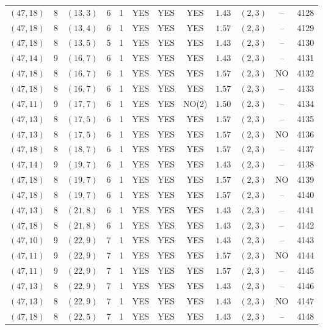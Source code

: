 \begin{longtable}{|c|c|c|c|c|c|c|c|c|c|c|c|}
$(47,18)$ & 8 & $(13,3)$ & 6 & 1 & YES & YES & YES & $1.43$ & $(2,3)$ & -- & 4128\\
$(47,18)$ & 8 & $(13,4)$ & 6 & 1 & YES & YES & YES & $1.57$ & $(2,3)$ & -- & 4129\\
$(47,18)$ & 8 & $(13,5)$ & 5 & 1 & YES & YES & YES & $1.43$ & $(2,3)$ & -- & 4130\\
$(47,14)$ & 9 & $(16,7)$ & 6 & 1 & YES & YES & YES & $1.43$ & $(2,3)$ & -- & 4131\\
$(47,18)$ & 8 & $(16,7)$ & 6 & 1 & YES & YES & YES & $1.57$ & $(2,3)$ & NO & 4132\\
$(47,18)$ & 8 & $(16,7)$ & 6 & 1 & YES & YES & YES & $1.57$ & $(2,3)$ & -- & 4133\\
$(47,11)$ & 9 & $(17,7)$ & 6 & 1 & YES & YES & NO(2) & $1.50$ & $(2,3)$ & -- & 4134\\
$(47,13)$ & 8 & $(17,5)$ & 6 & 1 & YES & YES & YES & $1.57$ & $(2,3)$ & -- & 4135\\
$(47,13)$ & 8 & $(17,5)$ & 6 & 1 & YES & YES & YES & $1.57$ & $(2,3)$ & NO & 4136\\
$(47,18)$ & 8 & $(18,7)$ & 6 & 1 & YES & YES & YES & $1.57$ & $(2,3)$ & -- & 4137\\
$(47,14)$ & 9 & $(19,7)$ & 6 & 1 & YES & YES & YES & $1.43$ & $(2,3)$ & -- & 4138\\
$(47,18)$ & 8 & $(19,7)$ & 6 & 1 & YES & YES & YES & $1.57$ & $(2,3)$ & NO & 4139\\
$(47,18)$ & 8 & $(19,7)$ & 6 & 1 & YES & YES & YES & $1.57$ & $(2,3)$ & -- & 4140\\
$(47,13)$ & 8 & $(21,8)$ & 6 & 1 & YES & YES & YES & $1.43$ & $(2,3)$ & -- & 4141\\
$(47,18)$ & 8 & $(21,8)$ & 6 & 1 & YES & YES & YES & $1.43$ & $(2,3)$ & -- & 4142\\
$(47,10)$ & 9 & $(22,9)$ & 7 & 1 & YES & YES & YES & $1.43$ & $(2,3)$ & -- & 4143\\
$(47,11)$ & 9 & $(22,9)$ & 7 & 1 & YES & YES & YES & $1.57$ & $(2,3)$ & NO & 4144\\
$(47,11)$ & 9 & $(22,9)$ & 7 & 1 & YES & YES & YES & $1.57$ & $(2,3)$ & -- & 4145\\
$(47,13)$ & 8 & $(22,9)$ & 7 & 1 & YES & YES & YES & $1.43$ & $(2,3)$ & -- & 4146\\
$(47,13)$ & 8 & $(22,9)$ & 7 & 1 & YES & YES & YES & $1.43$ & $(2,3)$ & NO & 4147\\
$(47,18)$ & 8 & $(22,5)$ & 7 & 1 & YES & YES & YES & $1.43$ & $(2,3)$ & -- & 4148\\

\end{longtable}
